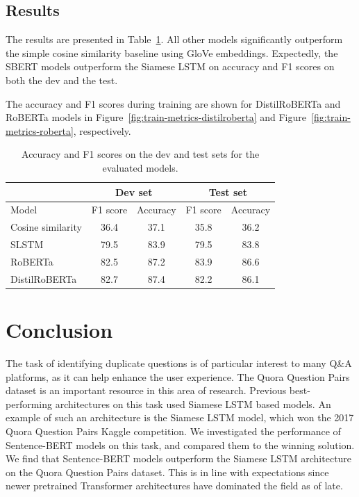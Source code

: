 \documentclass[10pt, a4paper]{article}
\begin{document}
\subsection{Results} \label{results}

The results are presented in Table~\ref{tab:results}.
All other models significantly outperform the simple cosine similarity baseline using GloVe embeddings.
Expectedly, the SBERT models outperform the Siamese LSTM on accuracy and F1 scores on both the dev and the test.

The accuracy and F1 scores during training are shown for DistilRoBERTa and RoBERTa models in Figure~\ref{fig:train-metrics-distilroberta} and Figure~\ref{fig:train-metrics-roberta}, respectively.

\begin{table}
\caption{Accuracy and F1 scores on the dev and test sets for the evaluated models.}
\label{tab:results}
\begin{center}
\begin{tabular}{lcccc}
\toprule
 & \multicolumn{2}{c}{Dev set} & \multicolumn{2}{c}{Test set} \\
\midrule
Model & F1 score & Accuracy & F1 score & Accuracy \\
\midrule
Cosine similarity & 36.4 & 37.1 & 35.8 & 36.2 \\
SLSTM & 79.5 & 83.9 & 79.5 & 83.8 \\
RoBERTa & 82.5 & 87.2 & 83.9 & 86.6 \\
DistilRoBERTa & 82.7 & 87.4 & 82.2 & 86.1 \\
\bottomrule
\end{tabular}
\end{center}
\end{table}

\section{Conclusion} \label{conclusion}

The task of identifying duplicate questions is of particular interest to many Q\&A platforms, as it can help enhance the user experience.
The Quora Question Pairs dataset is an important resource in this area of research. Previous best-performing architectures on this task used Siamese LSTM based models.
An example of such an architecture is the Siamese LSTM model, which won the 2017 Quora Question Pairs Kaggle competition.
We investigated the performance of Sentence-BERT models on this task, and compared them to the winning solution.
We find that Sentence-BERT models outperform the Siamese LSTM architecture on the Quora Question Pairs dataset.
This is in line with expectations since newer pretrained Transformer architectures have dominated the field as of late.



\end{document}
